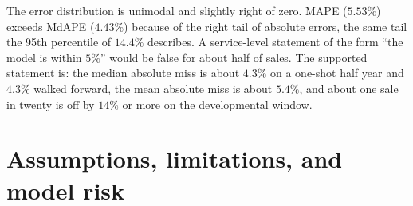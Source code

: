 \documentclass[11pt]{article}
\begin{document}
The error distribution is unimodal and slightly right of zero. MAPE (\(5.53\%\)) exceeds MdAPE (\(4.43\%\)) because of the right tail of absolute errors, the same tail the 95th percentile of \(14.4\%\) describes. A service-level statement of the form ``the model is within \(5\%\)'' would be false for about half of sales. The supported statement is: the median absolute miss is about \(4.3\%\) on a one-shot half year and \(4.3\%\) walked forward, the mean absolute miss is about \(5.4\%\), and about one sale in twenty is off by \(14\%\) or more on the developmental window.

\section{Assumptions, limitations, and model risk}
\label{sec:limits}
\end{document}
